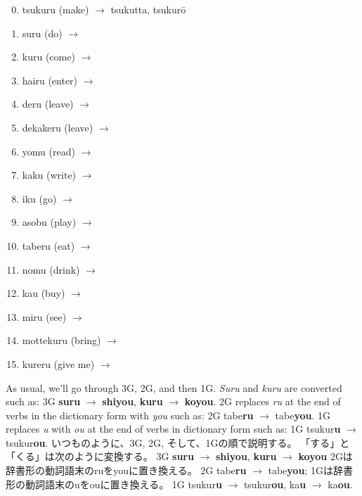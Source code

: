 \documentclass[uplatex,dvipdfmx,b5paper,english,10pt]{jsbook}
\begin{document}
\begin{multicols}{2}
\begin{enumerate}
\setcounter{enumi}{-1}
 \item tsukuru (make) $\rightarrow$ tsukutta, tsukur\=o \hrulefill
 \item suru (do)     $\rightarrow$ \hrulefill
 \item kuru (come)   $\rightarrow$ \hrulefill
 \item hairu (enter) $\rightarrow$\hrulefill
 \item deru (leave)  $\rightarrow$ \hrulefill
 \item dekakeru (leave) $\rightarrow$ \hrulefill
 \item yomu (read)   $\rightarrow$ \hrulefill
 \item kaku (write)  $\rightarrow$ \hrulefill
 \item iku (go)   $\rightarrow$ \hrulefill
 \item asobu (play)   $\rightarrow$ \hrulefill
 \item taberu (eat)   $\rightarrow$ \hrulefill
 \item nomu (drink)   $\rightarrow$ \hrulefill
 \item kau (buy)   $\rightarrow$ \hrulefill
 \item miru (see)   $\rightarrow$ \hrulefill
 \item mottekuru (bring)   $\rightarrow$ \hrulefill
 \item kureru (give me)   $\rightarrow$ \hrulefill
\end{enumerate}
\end{multicols}

\begin{toianswer}
\ifEnglish
As usual, we'll go through 3G, 2G, and then 1G.
{\it Suru\/} and {\it kuru\/} are converted such as:
3G {\bfseries suru} $\rightarrow$ {\bfseries shiyou}, {\bfseries kuru}    $\rightarrow$ {\bfseries koyou}.
2G replaces {\it ru\/} at the end of verbs in the dictionary form with {\it you\/} such as:
2G tabe{\bfseries ru}  $\rightarrow$ tabe{\bfseries you}.
1G replaces {\it u\/} with {\it ou\/} at the end of verbs in dictionary form such as:
1G tsukur{\bfseries u} $\rightarrow$ tsukur{\bfseries ou}.
\else
いつものように、3G, 2G, そして、1Gの順で説明する。
「する」と「くる」は次のように変換する。
 3G {\bfseries suru} $\rightarrow$ {\bfseries shiyou}, {\bfseries kuru}    $\rightarrow$ {\bfseries koyou}
2Gは辞書形の動詞語末のruをyouに置き換える。
 2G tabe{\bfseries ru}  $\rightarrow$ tabe{\bfseries you};
1Gは辞書形の動詞語末のuをouに置き換える。
 1G tsukur{\bfseries u} $\rightarrow$ tsukur{\bfseries ou},
   ka{\bfseries u} $\rightarrow$ ka{\bfseries ou}.
\fi
\end{toianswer}
\end{document}
